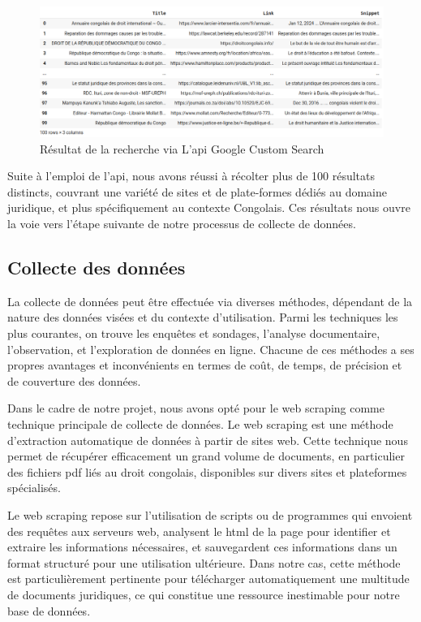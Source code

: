 \begin{figure}[H]
    \centering
    \includegraphics[width=15cm]{gfx/fig-google-search-result.png}
    \caption{Résultat de la recherche via L'\acs{api} Google Custom Search}
    \label{fig:google-search-result}
\end{figure}

Suite à l'emploi de l'\acs{api}, nous avons réussi à récolter plus de 100 résultats distincts, couvrant une variété de sites et de plate-formes dédiés au domaine juridique, et plus spécifiquement au contexte Congolais. Ces résultats nous ouvre la voie vers l'étape suivante de notre processus de collecte de données.

\subsection{Collecte des données}

La collecte de données peut être effectuée via diverses méthodes, dépendant de la nature des données visées et du contexte d'utilisation. Parmi les techniques les plus courantes, on trouve les enquêtes et sondages, l'analyse documentaire, l'observation, et l'exploration de données en ligne. Chacune de ces méthodes a ses propres avantages et inconvénients en termes de coût, de temps, de précision et de couverture des données.

Dans le cadre de notre projet, nous avons opté pour le web scraping comme technique principale de collecte de données. Le web scraping est une méthode d'extraction automatique de données à partir de sites web. Cette technique nous permet de récupérer efficacement un grand volume de documents, en particulier des fichiers \acs{pdf} liés au droit congolais, disponibles sur divers sites et plateformes spécialisés.

Le web scraping repose sur l'utilisation de scripts ou de programmes qui envoient des requêtes aux serveurs web, analysent le \acs{html} de la page pour identifier et extraire les informations nécessaires, et sauvegardent ces informations dans un format structuré pour une utilisation ultérieure. Dans notre cas, cette méthode est particulièrement pertinente pour télécharger automatiquement une multitude de documents juridiques, ce qui constitue une ressource inestimable pour notre base de données.

